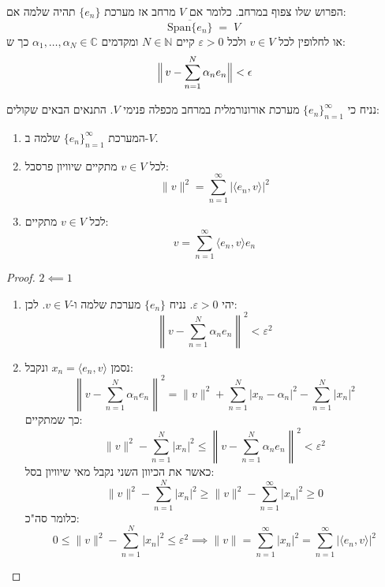 \documentclass{tstextbook}
\begin{document}
\begin{definition}
הפרוש שלו צפוף במרחב. כלומר אם \(V\) מרחב אז מערכת \(\{ e_{n} \}\) תהיה שלמה אם:
$$\overline{{{\mathrm{Span}\{e_{n}\}}}}\;=\;V\;$$
או לחלופין לכל \(v \in V\) ולכל \(\varepsilon>0\) קיים \(N \in \mathbb{N}\) ומקדמים \(\alpha_{1},\dots,\alpha_{N}\in \mathbb{C}\) כך ש:
$$\Bigl\|\,v-\sum_{n=1}^{N}\alpha_{n}e_{n}\Bigr\|<\epsilon$$

\end{definition}
\begin{proposition}
נניח כי \(\{ e_{n} \}_{n=1}^{\infty}\) מערכת אורונורמלית במרחב מכפלה פנימי \(V\). התנאים הבאים שקולים:

  \begin{enumerate}
    \item המערכת \(\{ e_{n} \}_{n=1}^{\infty}\) שלמה ב-\(V\). 


    \item לכל \(v \in V\) מתקיים שיוויון פרסבל: 
$$\lVert v \rVert ^{2}=\sum_{n=1}^{\infty}\lvert \langle e_{n},v \rangle  \rvert ^{2}$$


    \item לכל \(v \in V\) מתקיים: 
$$v=\sum_{n=1}^{\infty} \langle e_{n},v \rangle e_{n}$$


  \end{enumerate}
\end{proposition}
\begin{proof}
\(2\impliedby 1\)

  \begin{enumerate}
    \item יהי \(\varepsilon> 0\). נניח \(\{ e_{n} \}\) מערכת שלמה ו-\(v \in V\). לכן: 
$$\left\lVert v-\sum_{n=1}^{N}\alpha_{n}e_{n}\right\rVert ^{2}<\varepsilon^{2}$$


    \item נסמן \(x_{n}=\langle e_{n},v \rangle\) ונקבל: 
$$\left\lVert v-\sum_{n=1}^{N}\alpha_{n}e_{n}\right\rVert ^{2}=\|v\|^{2}+\sum_{n=1}^{N}|x_{n}-\alpha_{n}|^{2}-\sum_{n=1}^{N}|x_{n}|^{2}$$
כך שמתקיים:
$$\|v\|^{2}-\sum_{n=1}^{N}\left|x_{n}\right|^{2}\leq\left\lVert v-\sum_{n=1}^{N}\alpha_{n}e_{n}\right\rVert ^{2}<\varepsilon^{2}$$
כאשר את הכיוון השני נקבל מאי שיוויון בסל:
$$\lVert v \rVert^{2}-\sum_{n=1}^{N}\left|x_{n}\right|^{2}\geq\lVert v \rVert^{2}-\sum_{n=1}^{\infty}\left|x_{n}\right|^{2}\geq0$$
כלומר סה"כ:
$$0\leq\|v\|^{2}-\sum_{n=1}^{N}\left|x_{n}\right|^{2}\leq\varepsilon^{2}\implies \lVert v \rVert =\sum_{n=1}^{\infty}\left|x_{n}\right|^{2}=\sum_{n=1}^{\infty}\left|\langle e_{n},v\rangle\right|^{2}$$


  \end{enumerate}
\end{proof}
\end{document}
